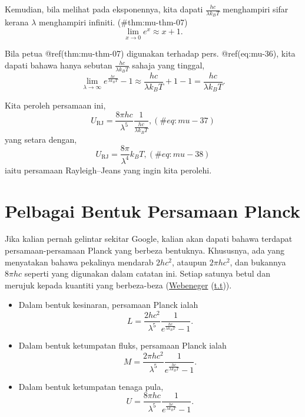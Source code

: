 \documentclass[
]{book}
\providecommand{\tightlist}{%
  \setlength{\itemsep}{0pt}\setlength{\parskip}{0pt}}
\begin{document}
Kemudian, bila melihat pada eksponennya, kita dapati
\(\frac{hc}{\lambda k_BT}\) menghampiri sifar kerana \(\lambda\)
menghampiri infiniti.
\BeginKnitrBlock{theorem}{}
\protect\hypertarget{thm:mu-thm-07}{}{(\#thm:mu-thm-07)
{}
}\[\lim_{x\to 0} e^x \approx x + 1.\] 

Bila petua @ref(thm:mu-thm-07) digunakan terhadap pers. @ref(eq:mu-36),
kita dapati bahawa hanya sebutan \(\frac{hc}{\lambda k_BT}\) sahaja yang
tinggal,
\[\lim_{\lambda\to\infty} e^{\frac{hc}{\lambda k_BT}}-1 \approx \frac{hc}{\lambda k_BT}+1 -1=\frac{hc}{\lambda k_BT}.\]

Kita peroleh persamaan ini, \begin{equation}
U_{\text{RJ}} = \frac{8\pi hc}{\lambda^5}\frac{1}{\frac{hc}{\lambda k_BT}},
(\#eq:mu-37)
\end{equation} yang setara dengan, \begin{equation}
U_{\text{RJ}} = \frac{8\pi}{\lambda^4}{k_BT},
(\#eq:mu-38)
\end{equation} iaitu persamaan Rayleigh--Jeans yang ingin kita perolehi.

\hypertarget{sec:bentuk-pers-planck}{%
\section{Pelbagai Bentuk Persamaan
Planck}\label{sec:bentuk-pers-planck}}

Jika kalian pernah gelintar sekitar Google, kalian akan dapati bahawa
terdapat persamaan-persamaan Planck yang berbeza bentuknya. Khususnya,
ada yang menyatakan bahawa pekalinya mendarab \(2 hc^2\), ataupun
\(2\pi hc^2\), dan bukannya \(8\pi hc\) seperti yang digunakan dalam
catatan ini. Setiap satunya betul dan merujuk kepada kuantiti yang
berbeza-beza (\protect\hyperlink{ref-Webeneger_tt}{Webeneger}
(\protect\hyperlink{ref-Webeneger_tt}{t.t})).

\begin{itemize}
\tightlist
\item
  Dalam bentuk kesinaran, persamaan Planck ialah
  \[L=\frac{2 hc^2}{\lambda^5}\frac{1}{e^{\frac{hc}{\lambda k_BT}}-1}.\]
\item
  Dalam bentuk ketumpatan fluks, persamaan Planck ialah
  \[M=\frac{2\pi hc^2}{\lambda^5}\frac{1}{e^{\frac{hc}{\lambda k_BT}}-1}.\]
\item
  Dalam bentuk ketumpatan tenaga pula,
  \[U=\frac{8\pi hc}{\lambda^5}\frac{1}{e^{\frac{hc}{\lambda k_BT}}-1}.\]
\end{itemize}
\end{document}
